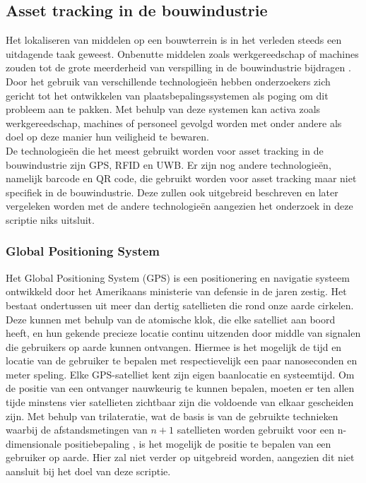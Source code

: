 \subsection{Asset tracking in de bouwindustrie}

Het lokaliseren van middelen op een bouwterrein is in het verleden steeds een uitdagende taak geweest. Onbenutte middelen zoals werkgereedschap of machines zouden tot de grote meerderheid van verspilling in de bouwindustrie bijdragen \autocite{Nasr2013}. Door het gebruik van verschillende technologieën hebben onderzoekers zich gericht tot het ontwikkelen van plaatsbepalingssystemen als poging om dit probleem aan te pakken. Met behulp van deze systemen kan activa zoals werkgereedschap, machines of personeel gevolgd worden met onder andere als doel op deze manier hun veiligheid te bewaren.\\

De technologieën die het meest gebruikt worden voor asset tracking in de bouwindustrie zijn GPS, RFID en UWB. Er zijn nog andere technologieën, namelijk barcode en QR code, die gebruikt worden voor asset tracking maar niet specifiek in de bouwindustrie. Deze zullen ook uitgebreid beschreven en later vergeleken worden met de andere technologieën aangezien het onderzoek in deze scriptie niks uitsluit.

\subsubsection{Global Positioning System}

Het Global Positioning System (GPS) is een positionering en navigatie systeem ontwikkeld door het Amerikaans ministerie van defensie \autocite{McNeff} in de jaren zestig. Het bestaat ondertussen uit meer dan dertig satellieten die rond onze aarde cirkelen. Deze kunnen met behulp van de atomische klok, die elke satelliet aan boord heeft, en hun gekende precieze locatie continu uitzenden door middle van signalen die gebruikers op aarde kunnen ontvangen. Hiermee is het mogelijk de tijd en locatie van de gebruiker te bepalen met respectievelijk een paar nanoseconden en meter speling. Elke GPS-satelliet kent zijn eigen baanlocatie en systeemtijd. Om de positie van een ontvanger nauwkeurig te kunnen bepalen, moeten er ten allen tijde minstens vier satellieten zichtbaar zijn die voldoende van elkaar gescheiden zijn. Met behulp van trilateratie, wat de basis is van de gebruikte technieken waarbij de afstandsmetingen van \(n + 1\) satellieten worden gebruikt voor een n-dimensionale positiebepaling \autocite{Rahman2012}, is het mogelijk de positie te bepalen van een gebruiker op aarde. Hier zal niet verder op uitgebreid worden, aangezien dit niet aansluit bij het doel van deze scriptie.\\

